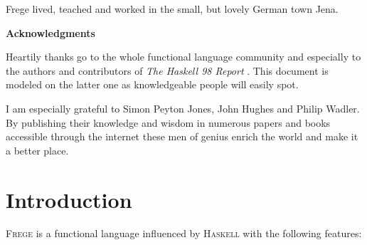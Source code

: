 \documentclass[a4paper,twocolumn,landscape]{report}
\newcommand{\haskell}[0]{\textsc{Haskell}}
\newcommand{\frege}[0]{\textsc{Frege}}
\begin{document}
\begin{twocolumn}
Frege lived, teached and worked in the small, but lovely German
town Jena.

\begin{center}\textbf{Acknowledgments}\end{center}

Heartily thanks go to the whole functional language community and
especially to the authors and contributors of
\emph{The Haskell 98 Report} \cite{h98r}.
This document is modeled on the latter one as knowledgeable people will
easily spot.

I am especially grateful to Simon Peyton Jones, John Hughes and Philip
Wadler. By publishing their knowledge
and wisdom in numerous papers and books accessible through the internet
these men of genius enrich the world and make it a better place.

\end{twocolumn}


\tableofcontents

\listoffigures


\chapter{Introduction}


\frege{} is a functional language influenced by \haskell{} with
the following features:
\end{document}
